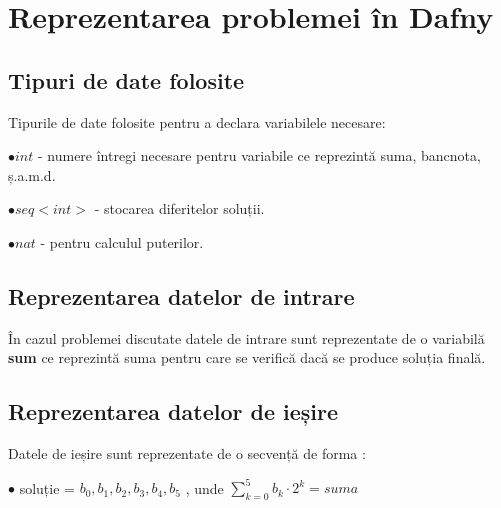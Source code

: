 \chapter{Reprezentarea problemei în Dafny}
\section{Tipuri de date folosite}
Tipurile de date folosite pentru a declara variabilele necesare:\par
 $\bullet int $ - numere întregi necesare pentru variabile ce reprezintă suma, bancnota, ș.a.m.d.\par
 $\bullet seq <int>$ - stocarea diferitelor soluții.\par
 $\bullet nat $ - pentru calculul puterilor.\par

\section{ Reprezentarea datelor de intrare }
În cazul problemei discutate datele de intrare sunt reprezentate de o variabilă \textbf{sum} ce reprezintă
 suma pentru care se verifică dacă se produce soluția finală.

\section{ Reprezentarea datelor de ieșire}
Datele de ieșire sunt reprezentate de o secvență de forma : \par
$\bullet$ soluție  = { $b_{0}, b_{1}, b_{2}, b_{3}, b_{4}, b_{5}$} , unde $\sum_{k=0}^{5} b_{k} \cdot 2^{k} = suma $